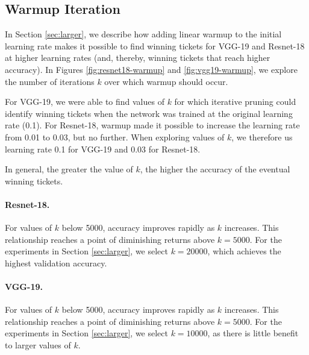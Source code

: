 \subsection{Warmup Iteration}

In Section \ref{sec:larger}, we describe how adding linear warmup to the initial learning rate makes it possible to find winning tickets for VGG-19 and Resnet-18 at higher learning rates (and, thereby, winning tickets that reach higher accuracy). In Figures \ref{fig:resnet18-warmup} and \ref{fig:vgg19-warmup}, we explore the number of iterations $k$ over which warmup should occur.

For VGG-19, we were able to find values of $k$ for which iterative pruning could identify winning tickets when the network was trained at the original learning rate (0.1). For Resnet-18, warmup made it possible to increase the learning rate from 0.01 to 0.03, but no further.
When exploring values of $k$, we therefore us learning rate 0.1 for VGG-19 and 0.03 for Resnet-18.

In general, the greater the value of $k$, the higher the accuracy of the eventual winning tickets.

\paragraph{Resnet-18.} For values of $k$ below 5000, accuracy improves rapidly as $k$ increases. This relationship reaches a point of diminishing returns above $k=5000$. For the experiments in Section \ref{sec:larger}, we select $k=20000$, which achieves the highest validation accuracy.

\paragraph{VGG-19.} For values of $k$ below 5000, accuracy improves rapidly as $k$ increases. This relationship reaches a point of diminishing returns above $k=5000$. For the experiments in Section \ref{sec:larger}, we select $k=10000$, as there is little benefit to larger values of $k$.

